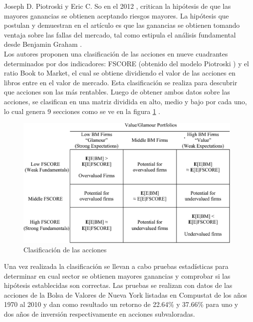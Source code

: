 
Joseph D. Piotroski y Eric C. So en el 2012 \cite{Piotroski2012}, critican la hipótesis de que las mayores ganancias se obtienen aceptando riesgos mayores. La hipótesis que postulan y demuestran en el art\'iculo es que las ganancias se obtienen tomando ventaja sobre las fallas del mercado, tal como estipula el an\'alisis fundamental desde Benjamin Graham \cite{BenjaminGraham2009}.\\

Los autores proponen una clasificación de las acciones en nueve cuadrantes determinados por dos indicadores: FSCORE (obtenido del modelo Piotroski \cite{Piotroski2000}) y el ratio Book to Market, el cual se obtiene dividiendo el valor de las acciones en libros entre en el valor de mercado. Esta clasificación se realiza para descubrir que acciones son las más rentables. Luego de obtener ambos datos sobre las acciones, se clasifican en una matriz dividida en alto, medio y bajo por cada uno, lo cual genera 9 secciones como se ve en la figura \ref{graf:matriz-valor-glamour} \cite{Piotroski2012}.\\

\begin{figure}
   \centering
   \includegraphics[scale=0.35]{imagenes/value_glamour_portfolio.jpg}
   \caption{Clasificaci\'on de las acciones \cite{Piotroski2012}}\label{graf:matriz-valor-glamour}
\end{figure}

Una vez realizada la clasificación se llevan a cabo pruebas estadísticas para determinar en cual sector se obtienen mayores ganancias y comprobar si las hipótesis establecidas son correctas. Las pruebas se realizan con datos de las acciones de la Bolsa de Valores de Nueva York listadas en Compustat de los años 1970 al 2010 y dan como resultado un retorno de 22.64\% y 37.66\% para uno y dos años de inversión respectivamente en acciones subvaloradas.\\




